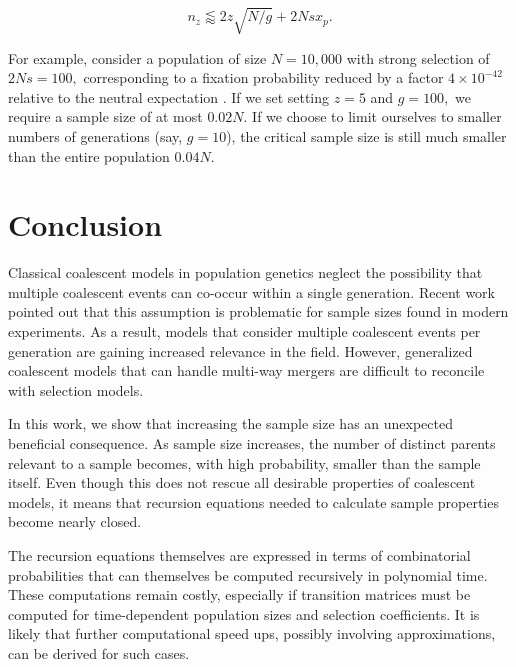 \documentclass[review,nonatbib]{elsarticle}
\begin{document}
\begin{equation}
  n_z \lessapprox 2 z\sqrt{N/g} + 2N s x_p.
\label{eq_nzg}
\end{equation}

For example, consider a population of size $N=10,000$ with strong selection
of $2Ns = 100,$ corresponding to a fixation probability reduced by a factor $4\times 10^{-42}$ relative 
to the neutral expectation \cite{Kimura:1962um}.  If we set setting $z=5$ and $g=100,$ we require a sample size of at most $0.02 N.$
 If we choose to limit ourselves to smaller numbers of generations (say, $g=10$), the critical sample 
 size is still much smaller than the entire population $0.04N$.
 
 
\section{Conclusion}
\label{sec_conclusion}


Classical coalescent models in population genetics neglect the possibility that multiple coalescent events 
can co-occur within a single generation. 
Recent work \citep{BhaskarEtAl2014,NelsonEtAl2019} pointed out that this
assumption is problematic for sample sizes found in modern experiments. As a result, models
that consider multiple coalescent events per generation are gaining increased relevance in the field.
However, generalized coalescent models that can handle multi-way mergers are difficult to reconcile 
with selection models.

In this work, we show that increasing the sample size has an unexpected beneficial consequence. 
As sample size increases, the number of distinct parents relevant to a sample becomes, 
with high probability, smaller than the sample itself. Even though this does not rescue
all desirable properties of coalescent models, it means that recursion equations 
needed to calculate sample properties become nearly closed. 

The recursion equations themselves  are expressed in terms of combinatorial probabilities 
that can themselves be computed recursively in polynomial time. These computations 
remain costly, especially if transition matrices must be computed for time-dependent
population sizes and selection coefficients. It is likely that further computational 
speed ups, possibly involving approximations, can be derived for such cases.  
\end{document}
